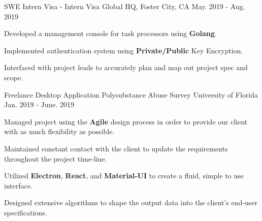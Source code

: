 


\begin{cventries}

	
	\cventry
	{SWE Intern} %
	{Visa - Intern} %
	{Visa Global HQ, Foster City, CA} %
	{May. 2019 - Aug. 2019} %
	{ %
		\begin{cvitems}
			\setlength{\itemindent}{.125in}
			\item {Developed a management console for task processors using \textbf{Golang}.}
			\item {Implemented authentication system using \textbf{Private/Public} Key Encryption. }
			\item {Interfaced with project leads to accurately plan and map out project spec and scope.}
		\end{cvitems}
	}
	
	
	\cventry
	{Freelance Desktop Application} %
	{Polysubstance Abuse Survey} %
	{University of Florida} %
	{Jan. 2019 - June. 2019} %
	{ %
		\begin{cvitems}
			\setlength{\itemindent}{.125in}
			\item {Managed project using the \textbf{Agile} design process in order to provide our client with as much flexibility as possible.}
			\item {Maintained constant contact with the client to update the requirements throughout the project time-line.}
			\item {Utilized \textbf{Electron}, \textbf{React}, and \textbf{Material-UI} to create a fluid, simple to use interface. }
			\item {Designed extensive algorithms to shape the output data into the client's end-user specifications.}
		\end{cvitems}
	}
	

\end{cventries}
